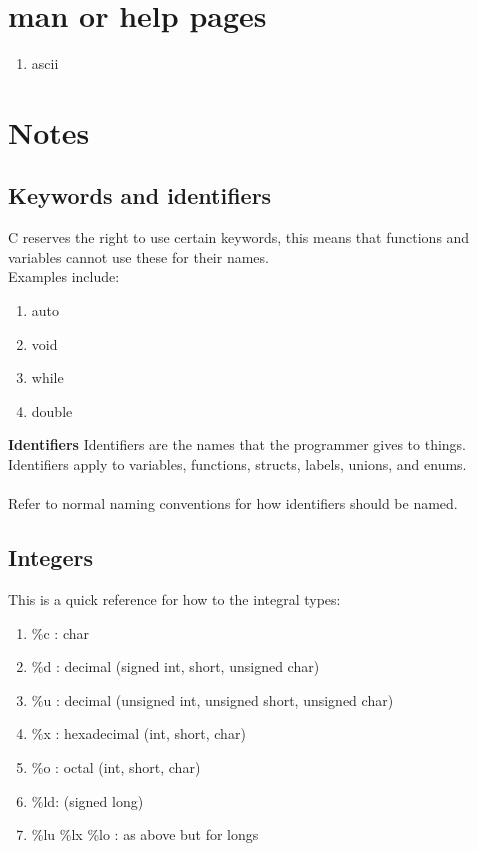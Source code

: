 \documentclass[12pt, letterpaper]{report}
\begin{document}
\section{man or help pages}
\begin{enumerate}
	\item ascii
\end{enumerate}

\section{Notes}
\subsection{Keywords and identifiers}
C reserves the right to use certain keywords, this means that functions and 
variables cannot use these for their names.\\
Examples include:
\begin{enumerate}
	\item auto 
	\item void
	\item while
	\item double
\end{enumerate}

\textbf{Identifiers}
Identifiers are the names that the programmer gives to things.\\
Identifiers apply to variables, functions, structs, labels, unions, and enums.\\\\

Refer to normal naming conventions for how identifiers should be named.

\subsection{Integers}
This is a quick reference for how to the integral types:
\begin{enumerate}
	\item \%c : char
	\item \%d : decimal (signed int, short, unsigned char)
	\item \%u : decimal (unsigned int, unsigned short, unsigned char)
	\item \%x : hexadecimal (int, short, char)
	\item \%o : octal (int, short, char)
	\item \%ld: (signed long)
	\item \%lu \%lx \%lo : as above but for longs
\end{enumerate}
\end{document}

